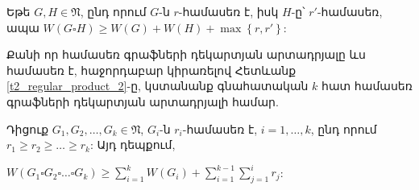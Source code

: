 \begin{corollary}
\label{t2_regular_product_2}
Եթե $G,H\in \mathfrak{N}$, ընդ որում $G$-ն $r$-համասեռ է, իսկ $H$-ը՝ $r'$-համասեռ, ապա $W(G\square H)\geq W(G)+W(H)+\max{\left\{r,r'\right\}}$:
\end{corollary}

Քանի որ համասեռ գրաֆների դեկարտյան արտադրյալը ևս համասեռ է, հաջորդաբար կիրառելով Հետևանք \ref{t2_regular_product_2}-ը, կստանանք գնահատական $k$ հատ համասեռ գրաֆների դեկարտյան արտադրյալի համար.

\begin{corollary}
\label{t2_regular_k_product} 
Դիցուք $G_1, G_2, \ldots, G_k \in \mathfrak{N}$, $G_i$-ն $r_i$-համասեռ է, $i=1,\ldots,k$, ընդ որում $r_1\geq r_2\geq \ldots \geq r_k$: Այդ դեպքում,
\begin{center}
$W(G_1 \square G_2 \square \ldots \square G_k) \geq \sum\limits_{i=1}^{k}W(G_i) + \sum\limits_{i=1}^{k-1}{\sum\limits_{j=1}^{i}{r_j}}$:
\end{center}
\end{corollary}

